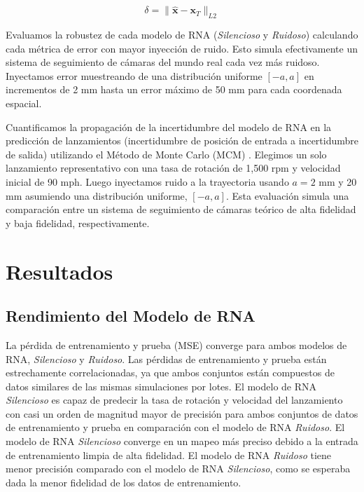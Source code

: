 \documentclass[12pt,a4paper]{article}
\begin{document}
\begin{equation}
\delta = \|\hat{\mathbf{x}} - \mathbf{x}_T\|_{L2}
\end{equation}

Evaluamos la robustez de cada modelo de RNA (\textit{Silencioso} y \textit{Ruidoso}) calculando cada métrica de error con mayor inyección de ruido. Esto simula efectivamente un sistema de seguimiento de cámaras del mundo real cada vez más ruidoso. Inyectamos error muestreando de una distribución uniforme $[-a, a]$ en incrementos de 2 mm hasta un error máximo de 50 mm para cada coordenada espacial.

Cuantificamos la propagación de la incertidumbre del modelo de RNA en la predicción de lanzamientos (incertidumbre de posición de entrada a incertidumbre de salida) utilizando el Método de Monte Carlo (MCM) \citep{metropolis1949,rubinstein2016}. Elegimos un solo lanzamiento representativo con una tasa de rotación de 1,500 rpm y velocidad inicial de 90 mph. Luego inyectamos ruido a la trayectoria usando $a = 2$ mm y 20 mm asumiendo una distribución uniforme, $[-a, a]$. Esta evaluación simula una comparación entre un sistema de seguimiento de cámaras teórico de alta fidelidad y baja fidelidad, respectivamente.

\section{Resultados}

\subsection{Rendimiento del Modelo de RNA}

La pérdida de entrenamiento y prueba (MSE) converge para ambos modelos de RNA, \textit{Silencioso} y \textit{Ruidoso}. Las pérdidas de entrenamiento y prueba están estrechamente correlacionadas, ya que ambos conjuntos están compuestos de datos similares de las mismas simulaciones por lotes. El modelo de RNA \textit{Silencioso} es capaz de predecir la tasa de rotación y velocidad del lanzamiento con casi un orden de magnitud mayor de precisión para ambos conjuntos de datos de entrenamiento y prueba en comparación con el modelo de RNA \textit{Ruidoso}. El modelo de RNA \textit{Silencioso} converge en un mapeo más preciso debido a la entrada de entrenamiento limpia de alta fidelidad. El modelo de RNA \textit{Ruidoso} tiene menor precisión comparado con el modelo de RNA \textit{Silencioso}, como se esperaba dada la menor fidelidad de los datos de entrenamiento.
\end{document}
